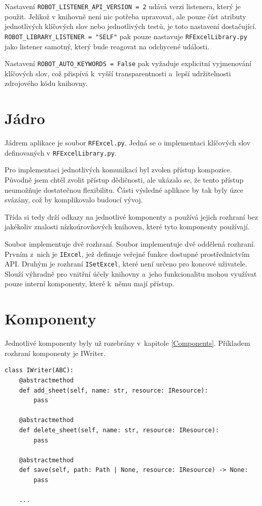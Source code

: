 Nastavení \texttt{ROBOT\_LISTENER\_API\_VERSION = 2} udává verzi listenera, který je použit. Jelikož v knihovně není nic potřeba upravovat, ale pouze číst atributy jednotlivých klíčových slov nebo jednotlivých testů, je toto nastavení dostačující. \texttt{ROBOT\_LIBRARY\_LISTENER = "SELF"} pak pouze nastavuje \texttt{RFExcelLibrary.py} jako listener samotný, který bude reagovat na odchycené události.

Nastavení \texttt{ROBOT\_AUTO\_KEYWORDS = False} pak vyžaduje explicitní vyjmenování klíčových slov, což přispívá k~vyšší transparentnosti a~lepší udržitelnosti zdrojového kódu knihovny.

\section{Jádro}

Jádrem aplikace je soubor \texttt{RFExcel.py}. Jedná se o implementaci klíčových slov definovaných v \texttt{RFExcelLibrary.py}.

Pro implementaci jednotlivých komunikací byl zvolen přístup kompozice. Původně jsem chtěl zvolit přístup dědičnosti, ale ukázalo se, že tento přístup neumožňuje dostatečnou flexibilitu. Části výsledné aplikace by tak byly úzce svázány, což by komplikovalo budoucí vývoj. 

Třída si tedy drží odkazy na jednotlivé komponenty a používá jejich rozhraní bez jakékoliv znalosti nízkoúrovňových knihoven, které tyto komponenty používají.

Soubor implementuje dvě rozhraní. Soubor implementuje dvě oddělená rozhraní. Prvním z~nich je \texttt{IExcel}, jež definuje veřejné funkce dostupné prostřednictvím API. Druhým je rozhraní \texttt{ISetExcel}, které není určeno pro koncové uživatele. Slouží výhradně pro vnitřní účely knihovny a~jeho funkcionalitu mohou využívat pouze interní komponenty, které k~němu mají přístup.

\section{Komponenty}

Jednotlivé komponenty byly už rozebrány v~kapitole \ref{Components}. Příkladem rozhraní komponenty je IWriter.

\begin{listing}[H]
    \begin{verbatim}
class IWriter(ABC):
	@abstractmethod
	def add_sheet(self, name: str, resource: IResource):
		pass

	@abstractmethod
	def delete_sheet(self, name: str, resource: IResource):
		pass

	@abstractmethod
	def save(self, path: Path | None, resource: IResource) -> None:
		pass

    ...
    \end{verbatim}
    
    \caption{Rozhraní komponenty \texttt{IWriter} - vlastní tvorba}
    \label{list:demo-library}
\end{listing}

